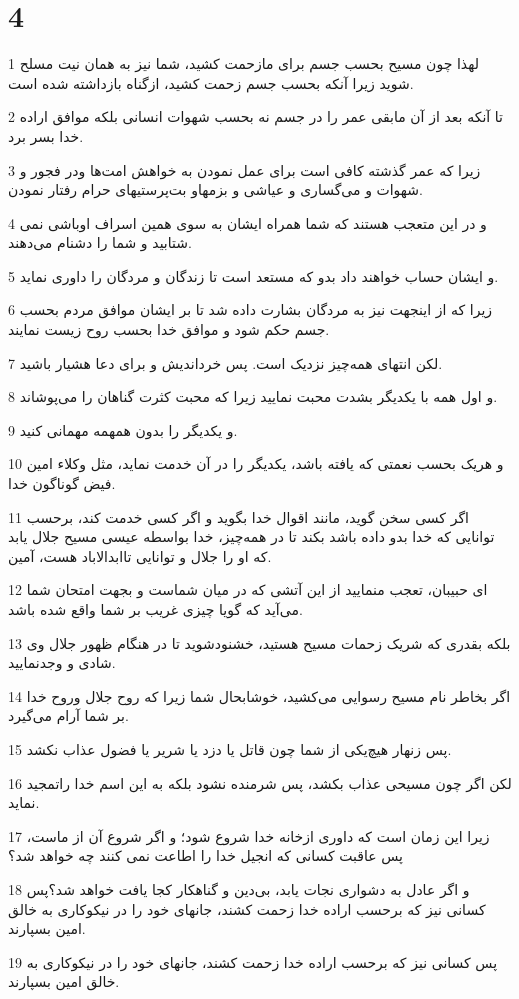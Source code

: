 \chapter{4}

\par 1 لهذا چون مسیح بحسب جسم برای مازحمت کشید، شما نیز به همان نیت مسلح شوید زیرا آنکه بحسب جسم زحمت کشید، ازگناه بازداشته شده است.
\par 2 تا آنکه بعد از آن مابقی عمر را در جسم نه بحسب شهوات انسانی بلکه موافق اراده خدا بسر برد.
\par 3 زیرا که عمر گذشته کافی است برای عمل نمودن به خواهش امت‌ها ودر فجور و شهوات و می‌گساری و عیاشی و بزمهاو بت‌پرستیهای حرام رفتار نمودن.
\par 4 و در این متعجب هستند که شما همراه ایشان به سوی همین اسراف اوباشی نمی شتابید و شما را دشنام می‌دهند.
\par 5 و ایشان حساب خواهند داد بدو که مستعد است تا زندگان و مردگان را داوری نماید.
\par 6 زیرا که از اینجهت نیز به مردگان بشارت داده شد تا بر ایشان موافق مردم بحسب جسم حکم شود و موافق خدا بحسب روح زیست نمایند.
\par 7 لکن انتهای همه‌چیز نزدیک است. پس خرداندیش و برای دعا هشیار باشید.
\par 8 و اول همه با یکدیگر بشدت محبت نمایید زیرا که محبت کثرت گناهان را می‌پوشاند.
\par 9 و یکدیگر را بدون همهمه مهمانی کنید.
\par 10 و هریک بحسب نعمتی که یافته باشد، یکدیگر را در آن خدمت نماید، مثل وکلاء امین فیض گوناگون خدا.
\par 11 اگر کسی سخن گوید، مانند اقوال خدا بگوید و اگر کسی خدمت کند، برحسب توانایی که خدا بدو داده باشد بکند تا در همه‌چیز، خدا بواسطه عیسی مسیح جلال یابد که او را جلال و توانایی تاابدالاباد هست، آمین.
\par 12 ‌ای حبیبان، تعجب منمایید از این آتشی که در میان شماست و بجهت امتحان شما می‌آید که گویا چیزی غریب بر شما واقع شده باشد.
\par 13 بلکه بقدری که شریک زحمات مسیح هستید، خشنودشوید تا در هنگام ظهور جلال وی شادی و وجدنمایید.
\par 14 اگر بخاطر نام مسیح رسوایی می‌کشید، خوشابحال شما زیرا که روح جلال وروح خدا بر شما آرام می‌گیرد.
\par 15 پس زنهار هیچ‌یکی از شما چون قاتل یا دزد یا شریر یا فضول عذاب نکشد.
\par 16 لکن اگر چون مسیحی عذاب بکشد، پس شرمنده نشود بلکه به این اسم خدا راتمجید نماید.
\par 17 زیرا این زمان است که داوری ازخانه خدا شروع شود؛ و اگر شروع آن از ماست، پس عاقبت کسانی که انجیل خدا را اطاعت نمی کنند چه خواهد شد؟
\par 18 و اگر عادل به دشواری نجات یابد، بی‌دین و گناهکار کجا یافت خواهد شد؟پس کسانی نیز که برحسب اراده خدا زحمت کشند، جانهای خود را در نیکوکاری به خالق امین بسپارند.
\par 19 پس کسانی نیز که برحسب اراده خدا زحمت کشند، جانهای خود را در نیکوکاری به خالق امین بسپارند.

